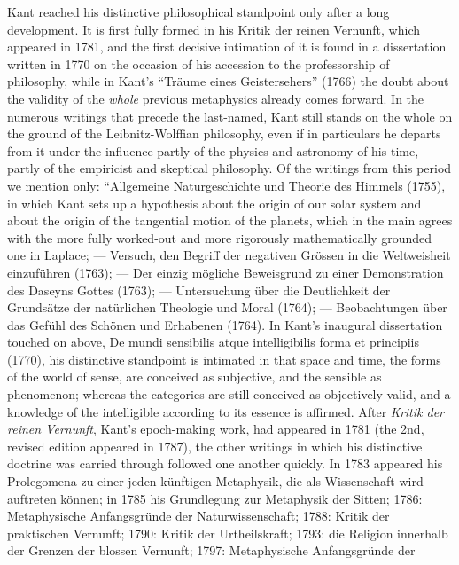 Kant reached his distinctive philosophical standpoint only after a long
development. It is first fully formed in his Kritik der reinen
Vernunft, which appeared in 1781, and the first decisive intimation of
it is found in a dissertation written in 1770 on the occasion of his
accession to the professorship of philosophy, while in Kant's
``Träume eines Geistersehers'' (1766) the doubt about the validity of
the \emph{whole} previous metaphysics already comes forward. In the
numerous writings that precede the last-named, Kant still stands on the
whole on the ground of the Leibnitz-Wolffian philosophy, even if in
particulars he departs from it under the influence partly of the
physics and astronomy of his time, partly of the empiricist and
skeptical philosophy. Of the writings from this period we mention only:
``Allgemeine Naturgeschichte und Theorie des Himmels (1755), in which
Kant sets up a hypothesis about the origin of our solar system and
about the origin of the tangential motion of the planets, which in the
main agrees with the more fully worked-out and more rigorously
mathematically grounded one in Laplace; --- Versuch, den Begriff der
negativen Grössen in die Weltweisheit einzuführen (1763);
--- Der einzig mögliche Beweisgrund zu einer Demonstration des Daseyns
Gottes (1763); --- Untersuchung über die Deutlichkeit der Grundsätze
der natürlichen Theologie und Moral (1764); --- Beobachtungen über das
Gefühl des Schönen und Erhabenen (1764). In Kant's inaugural
dissertation touched on above, De mundi sensibilis atque intelligibilis
forma et principiis (1770), his distinctive standpoint is intimated in
that space and time, the forms of the world of sense, are conceived as
subjective, and the sensible as phenomenon; whereas the categories are
still conceived as objectively valid, and a knowledge of the
intelligible according to its essence is affirmed. After \emph{Kritik
der reinen Vernunft}, Kant's epoch-making work, had appeared in 1781
(the 2nd, revised edition appeared in 1787), the other writings in
which his distinctive doctrine was carried through followed one another
quickly. In 1783 appeared his Prolegomena zu einer jeden künftigen
Metaphysik, die als Wissenschaft wird auftreten können; in 1785 his
Grundlegung zur Metaphysik der Sitten; 1786: Metaphysische
Anfangsgründe der Naturwissenschaft; 1788: Kritik der praktischen
Vernunft; 1790: Kritik der Urtheilskraft; 1793: die Religion innerhalb
der Grenzen der blossen Vernunft; 1797: Metaphysische Anfangsgründe der
